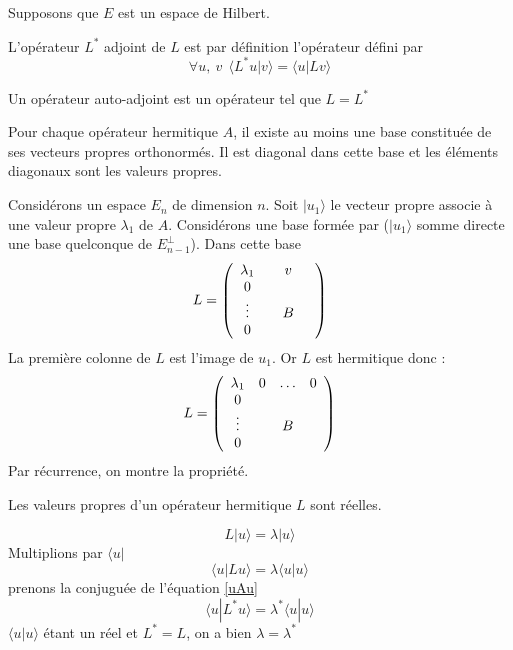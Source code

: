 \documentclass[12pt]{book}
\begin{document}
Supposons que $E$ est un espace de Hilbert.
\begin{defn}
L'op\'erateur $L^*$ adjoint de $L$ est par d\'efinition l'op\'erateur
d\'efini par 
\begin{equation} 
\forall u,\ v\  \ \langle L^*u|v\rangle = \langle u|Lv\rangle 
\end{equation}
\end{defn}
\begin{defn} 
Un op\'erateur auto-adjoint est un op\'erateur tel que $L=L^*$
\end{defn}
\begin{thm}
Pour chaque op\'erateur hermitique $A$, il existe au moins une base
constitu\'ee de ses vecteurs propres orthonorm\'es. Il est diagonal dans
cette base et les \'el\'ements diagonaux sont les valeurs propres.
\end{thm}
\begin{pf}
Consid\'erons un espace $E_n$ de dimension $n$. Soit  $|u_1\rangle $ le
vecteur propre associe \`a une valeur propre $\lambda_1$ de $A$.
Consid\'erons une base form\'ee par ($|u_1\rangle $ somme directe une base
quelconque de $E^\perp_{n-1}$).
Dans cette base  
\begin{equation}
L= 
\left( \begin{array}{cccc}
\lambda_1& &v& \cr
             0& & & \cr
             \vdots& &B& \cr
              0& & & \cr
\end{array} \right)
\end{equation}
La premi\`ere colonne de $L$ est l'image de $u_1$.
Or $L$ est hermitique donc :
\begin{equation}
L= 
\left( \begin{array}{cccc}
\lambda_1&0&\ldots&0 \cr
             0& & & \cr
             \vdots& &B& \cr
              0& & & \cr
\end{array} \right)
\end{equation}
Par r\'ecurrence, on montre la propri\'et\'e.
\end{pf}
\begin{thm}
Les valeurs propres d'un op\'erateur hermitique $L$ sont r\'eelles.
\end{thm}
\begin{pf}
\begin{equation}
L|u\rangle =\lambda|u\rangle 
\end{equation}
Multiplions par $ \langle u|$
\begin{equation}
 \langle u|Lu\rangle =\lambda \langle u|u\rangle 
\label{uAu}
\end{equation}
prenons la conjugu\'ee de l'\'equation \ref{uAu} 
\begin{equation}
 \langle u|L^*u\rangle =\lambda^* \langle u|u\rangle 
\end{equation}
$ \langle u|u\rangle $ \'etant un r\'eel et $L^*=L$, on a bien
$\lambda=\lambda^*$ 
\end{pf}
\end{document}
